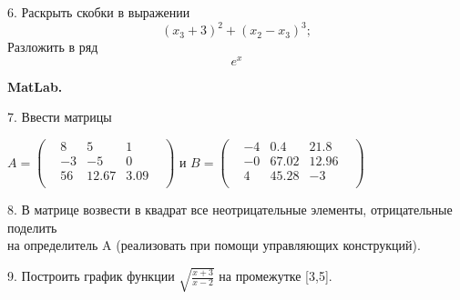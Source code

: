 \documentclass[12pt]{article}
\begin{document}
6. Раскрыть скобки в выражении\\ 	
\begin {equation*}
	{(x_3+3)}^2+{(x_2-x_3)^3};
\end {equation*}
Разложить в ряд $$e^x$$

\begin{center}\bf MatLab. \rm\end{center}

7. Ввести матрицы\\
\begin {center}
	$ A =
	\begin{pmatrix} 
		& 8 & 5 & 1 &\\
		& -3 & -5 & 0 &\\
		& 56 & 12.67 & 3.09 &\\
	\end{pmatrix}
	$
	и
	$ B =
	\begin{pmatrix} 
		& -4 & 0.4 & 21.8 &\\
		& -0 & 67.02 & 12.96 &\\
		& 4 & 45.28 & -3 &\\
	\end{pmatrix}
	$
\end {center}

8. В матрице возвести в квадрат все неотрицательные элементы, отрицательные поделить
	\\на определитель A (реализовать при помощи управляющих конструкций).

9. Построить график функции $ \sqrt{\frac{x+3}{x-2}} $ на промежутке [3,5].
\end{document}
